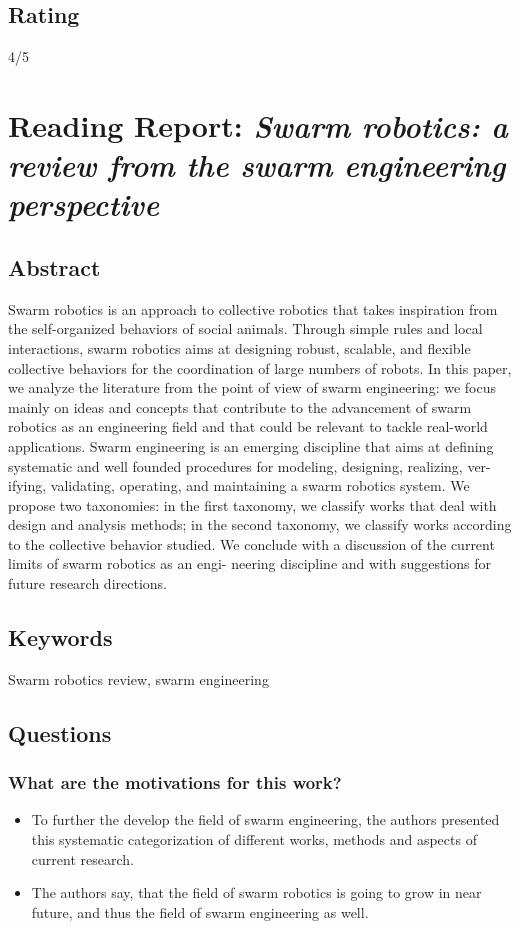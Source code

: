 \subsection*{Rating}
4/5



\section{Reading Report: \emph{Swarm robotics: a review from the swarm engineering perspective}}
\cite{Brambilla2013}

\subsection*{Abstract}
Swarm robotics is an approach to collective robotics that takes inspiration from
the self-organized behaviors of social animals. Through simple rules and local interactions,
swarm robotics aims at designing robust, scalable, and flexible collective behaviors for the
coordination of large numbers of robots. In this paper, we analyze the literature from the
point of view of swarm engineering: we focus mainly on ideas and concepts that contribute
to the advancement of swarm robotics as an engineering field and that could be relevant
to tackle real-world applications. Swarm engineering is an emerging discipline that aims at
defining systematic and well founded procedures for modeling, designing, realizing, ver-
ifying, validating, operating, and maintaining a swarm robotics system. We propose two
taxonomies: in the first taxonomy, we classify works that deal with design and analysis
methods; in the second taxonomy, we classify works according to the collective behavior
studied. We conclude with a discussion of the current limits of swarm robotics as an engi-
neering discipline and with suggestions for future research directions.

\subsection*{Keywords}
Swarm robotics review, swarm engineering


\subsection*{Questions}
\subsubsection*{What are the motivations for this work?}
\begin{itemize}
    \item To further the develop the field of swarm engineering, the authors presented this systematic categorization of different works, methods and aspects of current research.
    \item The authors say, that the field of swarm robotics is going to grow in near future, and thus the field of swarm engineering as well.
\end{itemize}
